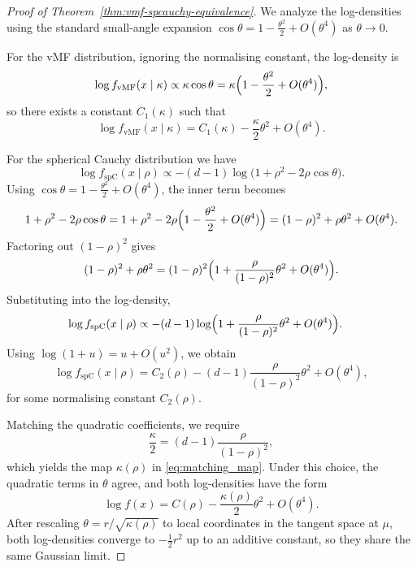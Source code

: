\documentclass{article}
\begin{document}
\begin{proof}[Proof of Theorem~\ref{thm:vmf-spcauchy-equivalence}]
We analyze the log-densities using the standard small-angle expansion
$\cos\theta = 1 - \frac{\theta^2}{2} + O(\theta^4)$ as $\theta \to 0$.

For the vMF distribution, ignoring the normalising constant, the log-density is
\[
  \log f_{\mathrm{vMF}}(x \mid \kappa)
  \propto \kappa\cos\theta 
  = \kappa\Bigl(1 - \frac{\theta^2}{2} + O(\theta^4)\Bigr),
\]
so there exists a constant $C_1(\kappa)$ such that
\[
  \log f_{\mathrm{vMF}}(x \mid \kappa)
  = C_1(\kappa) - \frac{\kappa}{2}\theta^2 + O(\theta^4).
\]

For the spherical Cauchy distribution we have
\[
  \log f_{\mathrm{spC}}(x \mid \rho)
  \propto
  - (d-1)\log\bigl(1 + \rho^2 - 2\rho\cos\theta\bigr).
\]
Using $\cos\theta = 1 - \frac{\theta^2}{2} + O(\theta^4)$, the inner term becomes
\[
  1 + \rho^2 - 2\rho\cos\theta
  =
  1 + \rho^2 - 2\rho\Bigl(1 - \frac{\theta^2}{2} + O(\theta^4)\Bigr)
  =
  (1-\rho)^2 + \rho\theta^2 + O(\theta^4).
\]
Factoring out $(1-\rho)^2$ gives
\[
  (1-\rho)^2 + \rho\theta^2
  =
  (1-\rho)^2\Bigl(1 + \frac{\rho}{(1-\rho)^2}\theta^2 + O(\theta^4)\Bigr).
\]
Substituting into the log-density,
\begin{align*}
  \log f_{\mathrm{spC}}(x \mid \rho)
  &\propto
  - (d-1)\log\Bigl(1 + \frac{\rho}{(1-\rho)^2}\theta^2 + O(\theta^4)\Bigr).
\end{align*}
Using $\log(1+u) = u + O(u^2)$, we obtain
\[
  \log f_{\mathrm{spC}}(x \mid \rho)
  =
  C_2(\rho)
  - (d-1)\frac{\rho}{(1-\rho)^2}\theta^2 + O(\theta^4),
\]
for some normalising constant $C_2(\rho)$.

Matching the quadratic coefficients, we require
\[
  \frac{\kappa}{2}
  =
  (d-1)\frac{\rho}{(1-\rho)^2},
\]
which yields the map $\kappa(\rho)$ in \eqref{eq:matching_map}.
Under this choice, the quadratic terms in $\theta$ agree, and both log-densities have
the form
\[
  \log f(x) = C(\rho) - \frac{\kappa(\rho)}{2}\theta^2 + O(\theta^4).
\]
After rescaling $\theta = r / \sqrt{\kappa(\rho)}$ to local coordinates in the
tangent space at $\mu$, both log-densities converge to $-\frac{1}{2}r^2$ up to an
additive constant, so they share the same Gaussian limit.
\end{proof}
\end{document}
